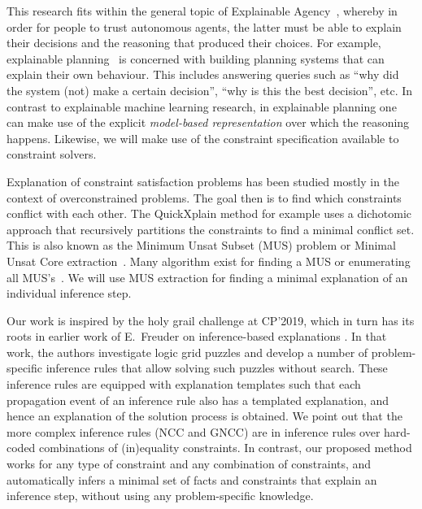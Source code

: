 This research fits within the general topic of Explainable Agency~\cite{langley2017explainable}, whereby in order for people to trust autonomous agents, the latter must be able to explain their decisions and the reasoning that produced their choices. 
For example, explainable planning~\cite{fox2017explainable} is concerned with building planning systems that can explain their own behaviour. This includes answering queries such as ``why did the system (not) make a certain decision'', ``why is this the best decision'', etc. In contrast to explainable machine learning research, in explainable planning one can make use of the explicit \textit{model-based representation} over which the reasoning happens. Likewise, we will make use of the constraint specification available to constraint solvers. %

Explanation of constraint satisfaction problems has been studied mostly in the context of overconstrained problems. 
The goal then is to find which constraints conflict with each other. The QuickXplain method \cite{junker2001quickxplain} for example uses a dichotomic approach that recursively partitions the constraints to find a minimal conflict set. This is also known as the Minimum Unsat Subset (MUS) problem or Minimal Unsat Core extraction~\cite{marques2010minimal}. Many algorithm exist for finding a MUS or enumerating all MUS's~\cite{marques2010minimal}. We will use MUS extraction for finding a minimal explanation of an individual inference step.

Our work is inspired by the holy grail challenge at CP'2019, which in turn has its roots in earlier work of E.~Freuder on inference-based explanations \cite{sqalli1996inference}. In that work, the authors investigate logic grid puzzles and develop a number of problem-specific inference rules that allow solving such puzzles without search. These inference rules are equipped with explanation templates such that each propagation event of an inference rule also has a templated explanation, and hence an explanation of the solution process is obtained. We point out that the more complex inference rules (NCC and GNCC) are in inference rules over hard-coded combinations of (in)equality constraints. In contrast, our proposed method works for any type of constraint and any combination of constraints, and automatically infers a minimal set of facts and constraints that explain an inference step, without using any problem-specific knowledge. %

